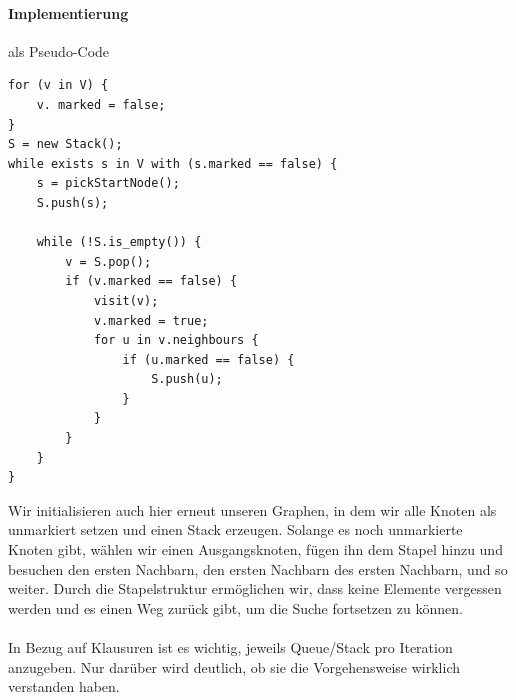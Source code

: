 \documentclass[11pt,a4paper]{scrartcl}
\begin{document}
\paragraph{Implementierung} als Pseudo-Code
\begin{lstlisting}
for (v in V) {
	v. marked = false;
}
S = new Stack();
while exists s in V with (s.marked == false) {
	s = pickStartNode();
	S.push(s);
	
	while (!S.is_empty()) {
		v = S.pop();
		if (v.marked == false) {
			visit(v);
			v.marked = true;
			for u in v.neighbours {
				if (u.marked == false) {
					S.push(u);				
				}			
			}		
		}	
	}
}
\end{lstlisting}
Wir initialisieren auch hier erneut unseren Graphen, in dem wir alle Knoten als unmarkiert setzen und einen Stack erzeugen. Solange es noch unmarkierte Knoten gibt, wählen wir einen Ausgangsknoten, fügen ihn dem Stapel hinzu und besuchen den ersten Nachbarn, den ersten Nachbarn des ersten Nachbarn, und so weiter. Durch die Stapelstruktur ermöglichen wir, dass keine Elemente vergessen werden und es einen {\glqq}Weg zurück{\grqq} gibt, um die Suche fortsetzen zu können. \\\\
In Bezug auf Klausuren ist es wichtig, jeweils Queue/Stack pro Iteration anzugeben. Nur darüber wird deutlich, ob sie die Vorgehensweise wirklich verstanden haben. \\
\end{document}
